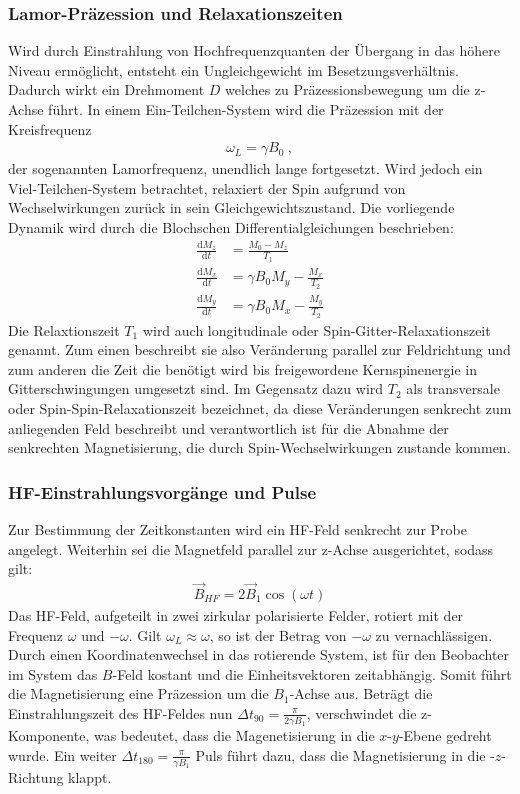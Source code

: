 \subsubsection{Lamor-Präzession und Relaxationszeiten}
Wird durch Einstrahlung von Hochfrequenzquanten der Übergang in das höhere Niveau ermöglicht, entsteht ein Ungleichgewicht im Besetzungsverhältnis. Dadurch wirkt ein Drehmoment $D$ welches zu Präzessionsbewegung um die z-Achse führt. In einem Ein-Teilchen-System wird die Präzession mit der Kreisfrequenz
\begin{align}
	\omega_L=\gamma B_0 \:,
	\label{eq:Lamor}
\end{align}
der sogenannten Lamorfrequenz, unendlich lange fortgesetzt. Wird jedoch ein Viel-Teilchen-System betrachtet, relaxiert der Spin aufgrund von Wechselwirkungen zurück in sein Gleichgewichtszustand. Die vorliegende Dynamik wird durch die Blochschen Differentialgleichungen beschrieben:
\begin{align}
	\frac{\text{d}M_z}{\text{d}t}&=\frac{M_0-M_z}{T_1}\\
	\frac{\text{d}M_x}{\text{d}t}&=\gamma B_0 M_y -\frac{M_x}{T_2}\\
	\frac{\text{d}M_y}{\text{d}t}&=\gamma B_0 M_x -\frac{M_y}{T_2}
	\label{eq:Bloch}
\end{align}
Die Relaxtionszeit $T_1$ wird auch longitudinale oder Spin-Gitter-Relaxationszeit genannt. Zum einen beschreibt sie also Veränderung parallel zur Feldrichtung und zum anderen die Zeit die benötigt wird bis freigewordene Kernspinenergie in Gitterschwingungen umgesetzt sind. Im Gegensatz dazu wird $T_2$ als transversale oder Spin-Spin-Relaxationszeit bezeichnet, da diese Veränderungen senkrecht zum anliegenden Feld beschreibt und verantwortlich ist für die Abnahme der senkrechten Magnetisierung, die durch Spin-Wechselwirkungen zustande kommen.

\subsubsection{HF-Einstrahlungsvorgänge und Pulse}
Zur Bestimmung der Zeitkonstanten wird ein HF-Feld senkrecht zur Probe angelegt. Weiterhin sei die Magnetfeld parallel zur z-Achse ausgerichtet, sodass gilt:
\begin{align}
	\vec{B}_{HF}=2\vec{B}_1 \cos{(\omega t)}
	\label{eq:8}
\end{align}
Das HF-Feld, aufgeteilt in zwei zirkular polarisierte Felder, rotiert mit der Frequenz $\omega$ und $-\omega$. Gilt $\omega_L \approx \omega$, so ist der Betrag von $-\omega$ zu vernachlässigen. Durch einen Koordinatenwechsel in das rotierende System, ist für den Beobachter im System das $B$-Feld kostant und die Einheitsvektoren zeitabhängig. Somit führt die Magnetisierung eine Präzession um die $B_1$-Achse aus. Beträgt die Einstrahlungszeit des HF-Feldes nun $\Delta t_{90}=\frac{\pi}{2\gamma B_1}$, verschwindet die z-Komponente, was bedeutet, dass die Magenetisierung in die $x$-$y$-Ebene gedreht wurde. Ein weiter $\Delta t_{180}=\frac{\pi}{\gamma B_1}$ Puls führt dazu, dass die Magnetisierung in die -$z$-Richtung klappt.

